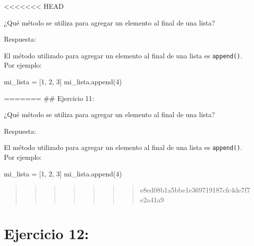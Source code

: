 \documentclass[
  a4paper,
  onepage,
  openany]{scrreprt}
\newenvironment{Shaded}{\begin{snugshade}}{\end{snugshade}}
\newcommand{\DecValTok}[1]{\textcolor[rgb]{0.68,0.00,0.00}{#1}}
\newcommand{\NormalTok}[1]{\textcolor[rgb]{0.00,0.23,0.31}{#1}}
\newcommand{\OperatorTok}[1]{\textcolor[rgb]{0.37,0.37,0.37}{#1}}
\begin{document}
\textless\textless\textless\textless\textless\textless\textless{} HEAD

¿Qué método se utiliza para agregar un elemento al final de una lista?

Respuesta:

El método utilizado para agregar un elemento al final de una lista es
\texttt{append()}. Por ejemplo:

\begin{Shaded}
\begin{Highlighting}[]
\NormalTok{mi\_lista }\OperatorTok{=}\NormalTok{ [}\DecValTok{1}\NormalTok{, }\DecValTok{2}\NormalTok{, }\DecValTok{3}\NormalTok{]}
\NormalTok{mi\_lista.append(}\DecValTok{4}\NormalTok{)}
\end{Highlighting}
\end{Shaded}

======= \#\# Ejercicio 11:

¿Qué método se utiliza para agregar un elemento al final de una lista?

Respuesta:

El método utilizado para agregar un elemento al final de una lista es
\texttt{append()}. Por ejemplo:

\begin{Shaded}
\begin{Highlighting}[]
\NormalTok{mi\_lista }\OperatorTok{=}\NormalTok{ [}\DecValTok{1}\NormalTok{, }\DecValTok{2}\NormalTok{, }\DecValTok{3}\NormalTok{]}
\NormalTok{mi\_lista.append(}\DecValTok{4}\NormalTok{)}
\end{Highlighting}
\end{Shaded}

\begin{quote}
\begin{quote}
\begin{quote}
\begin{quote}
\begin{quote}
\begin{quote}
\begin{quote}
e8ed08b1a5bbe1e369719187cfc4de7f7e2a41a9
\end{quote}
\end{quote}
\end{quote}
\end{quote}
\end{quote}
\end{quote}
\end{quote}

\hypertarget{ejercicio-12}{%
\chapter{Ejercicio 12:}\label{ejercicio-12}}
\end{document}
